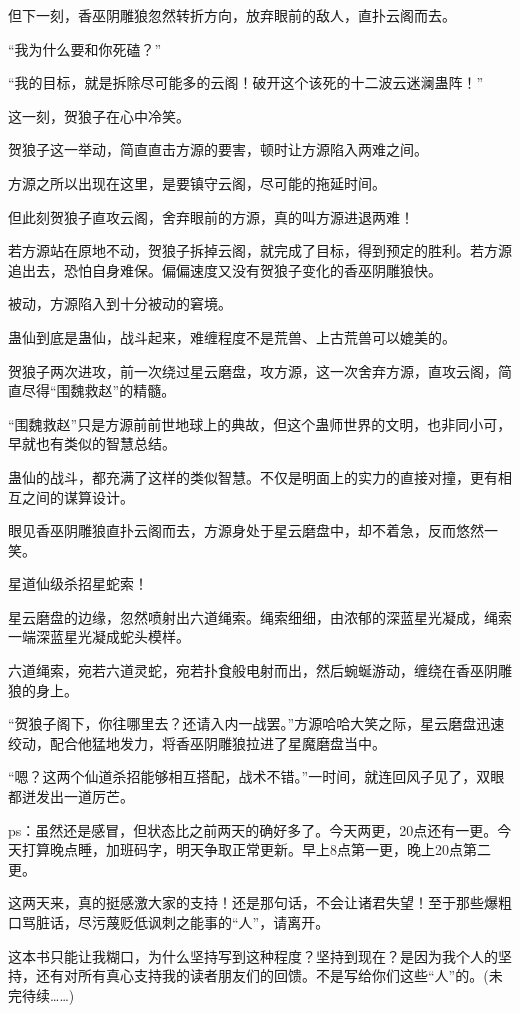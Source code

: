 \begin{this_body}
但下一刻，香巫阴雕狼忽然转折方向，放弃眼前的敌人，直扑云阁而去。

“我为什么要和你死磕？”

“我的目标，就是拆除尽可能多的云阁！破开这个该死的十二波云迷澜蛊阵！”

这一刻，贺狼子在心中冷笑。

贺狼子这一举动，简直直击方源的要害，顿时让方源陷入两难之间。

方源之所以出现在这里，是要镇守云阁，尽可能的拖延时间。

但此刻贺狼子直攻云阁，舍弃眼前的方源，真的叫方源进退两难！

若方源站在原地不动，贺狼子拆掉云阁，就完成了目标，得到预定的胜利。若方源追出去，恐怕自身难保。偏偏速度又没有贺狼子变化的香巫阴雕狼快。

被动，方源陷入到十分被动的窘境。

蛊仙到底是蛊仙，战斗起来，难缠程度不是荒兽、上古荒兽可以媲美的。

贺狼子两次进攻，前一次绕过星云磨盘，攻方源，这一次舍弃方源，直攻云阁，简直尽得“围魏救赵”的精髓。

“围魏救赵”只是方源前前世地球上的典故，但这个蛊师世界的文明，也非同小可，早就也有类似的智慧总结。

蛊仙的战斗，都充满了这样的类似智慧。不仅是明面上的实力的直接对撞，更有相互之间的谋算设计。

眼见香巫阴雕狼直扑云阁而去，方源身处于星云磨盘中，却不着急，反而悠然一笑。

星道仙级杀招星蛇索！

星云磨盘的边缘，忽然喷射出六道绳索。绳索细细，由浓郁的深蓝星光凝成，绳索一端深蓝星光凝成蛇头模样。

六道绳索，宛若六道灵蛇，宛若扑食般电射而出，然后蜿蜒游动，缠绕在香巫阴雕狼的身上。

“贺狼子阁下，你往哪里去？还请入内一战罢。”方源哈哈大笑之际，星云磨盘迅速绞动，配合他猛地发力，将香巫阴雕狼拉进了星魔磨盘当中。

“嗯？这两个仙道杀招能够相互搭配，战术不错。”一时间，就连回风子见了，双眼都迸发出一道厉芒。

ps：虽然还是感冒，但状态比之前两天的确好多了。今天两更，20点还有一更。今天打算晚点睡，加班码字，明天争取正常更新。早上8点第一更，晚上20点第二更。

这两天来，真的挺感激大家的支持！还是那句话，不会让诸君失望！至于那些爆粗口骂脏话，尽污蔑贬低讽刺之能事的“人”，请离开。

这本书只能让我糊口，为什么坚持写到这种程度？坚持到现在？是因为我个人的坚持，还有对所有真心支持我的读者朋友们的回馈。不是写给你们这些“人”的。(未完待续……)

\end{this_body}


